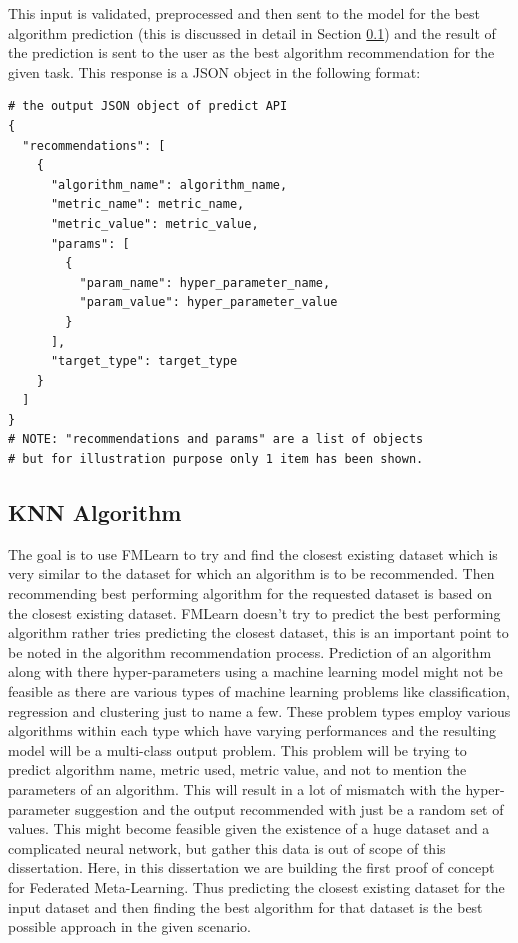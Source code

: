 This input is validated, preprocessed and then sent to the model for the best algorithm prediction (this is discussed in detail in Section \ref{knn-model}) and the result of the prediction is sent to the user as the best algorithm recommendation for the given task. This response is a JSON object in the following format:

\begin{lstlisting}
# the output JSON object of predict API
{
  "recommendations": [
    {
      "algorithm_name": algorithm_name,
      "metric_name": metric_name,
      "metric_value": metric_value,
      "params": [
        {
          "param_name": hyper_parameter_name,
          "param_value": hyper_parameter_value
        }
      ],
      "target_type": target_type
    }
  ]
}
# NOTE: "recommendations and params" are a list of objects
# but for illustration purpose only 1 item has been shown.
\end{lstlisting}

\subsection{KNN Algorithm}
\label{knn-model}

The goal is to use FMLearn to try and find the closest existing dataset which is very similar to the dataset for which an algorithm is to be recommended. Then recommending best performing algorithm for the requested dataset is based on the closest existing dataset. FMLearn doesn't try to predict the best performing algorithm rather tries predicting the closest dataset, this is an important point to be noted in the algorithm recommendation process. Prediction of an algorithm along with there hyper-parameters using a machine learning model might not be feasible as there are various types of machine learning problems like classification, regression and clustering just to name a few. These problem types employ various algorithms within each type which have varying performances and the resulting model will be a multi-class output problem. This problem will be trying to predict algorithm name, metric used, metric value, and not to mention the parameters of an algorithm. This will result in a lot of mismatch with the hyper-parameter suggestion and the output recommended with just be a random set of values. This might become feasible given the existence of a huge dataset and a complicated neural network, but gather this data is out of scope of this dissertation. Here, in this dissertation we are building the first proof of concept for Federated Meta-Learning. Thus predicting the closest existing dataset for the input dataset and then finding the best algorithm for that dataset is the best possible approach in the given scenario.

